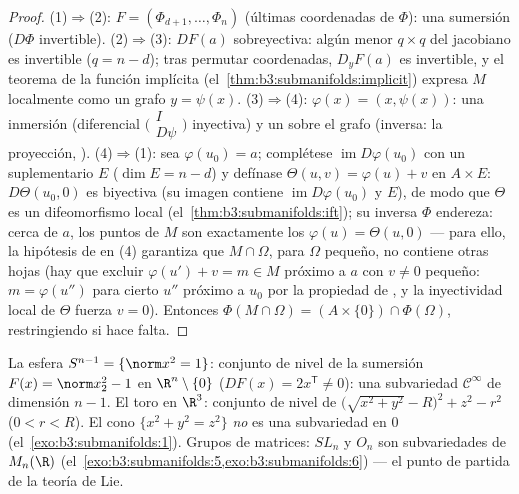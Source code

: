 \begin{proof}
(1)$\Rightarrow$(2): $F = (\Phi_{d+1}, \dots, \Phi_n)$ (últimas
coordenadas de $\Phi$): una sumersión ($D\Phi$ invertible).
(2)$\Rightarrow$(3): $DF(a)$ sobreyectiva: algún menor $q \times q$ del
jacobiano es invertible ($q = n - d$); tras permutar coordenadas,
$D_yF(a)$ es invertible, y el teorema de la función implícita
(el~\cref{thm:b3:submanifolds:implicit}) expresa $M$ localmente como un
grafo $y = \psi(x)$. (3)$\Rightarrow$(4): $\varphi(x) = (x, \psi(x))$:
una inmersión (diferencial $\bigl(\begin{smallmatrix}I\\
D\psi\end{smallmatrix}\bigr)$ inyectiva) y un
 sobre el grafo
(inversa: la proyección, ).
(4)$\Rightarrow$(1): sea $\varphi(u_0) = a$;
complétese
$\operatorname{im}D\varphi(u_0)$ con un suplementario $E$
($\dim E = n - d$) y defínase $\Theta(u, v) = \varphi(u) + v$ en
$A\times E$: $D\Theta(u_0, 0)$ es biyectiva (su imagen contiene
$\operatorname{im}D\varphi(u_0)$ y $E$), de modo que $\Theta$ es un
difeomorfismo local (el~\cref{thm:b3:submanifolds:ift}); su inversa
$\Phi$ endereza: cerca de $a$, los puntos de $M$ son exactamente los
$\varphi(u) = \Theta(u, 0)$ --- para ello, la hipótesis de
 en (4) garantiza que
$M\cap\Omega$, para $\Omega$ pequeño, no contiene otras hojas (hay que
excluir $\varphi(u') + v = m \in
M$ próximo a $a$ con $v \neq 0$ pequeño: $m = \varphi(u'')$ para cierto
$u''$ próximo a $u_0$ por la propiedad de
, y la inyectividad
local de $\Theta$ fuerza $v = 0$). Entonces
$\Phi(M\cap\Omega) = (A\times\{0\})
\cap\Phi(\Omega)$, restringiendo si hace falta.
\end{proof}

\begin{example}\label{ex:b3:submanifolds:examples}
La esfera $S^{n-1} = \{\norm x^2 = 1\}$: conjunto de nivel de la
sumersión $F(x) = \norm x_2^2 - 1$ en
$\R^n\setminus\{0\}$ ($DF(x) = 2x^{\mathsf T} \ne 0$):
una subvariedad $\mathcal C^\infty$ de dimensión $n - 1$. El toro en
$\R^3$: conjunto de nivel de $\bigl(\sqrt{x^2 + y^2} -
R\bigr)^2 + z^2 - r^2$ ($0 < r < R$). El cono $\{x^2 + y^2 =
z^2\}$ \emph{no} es una subvariedad en $0$
(el~\cref{exo:b3:submanifolds:1}). Grupos de matrices: $SL_n$ y $O_n$
son subvariedades de $M_n(\R)$
(el~\cref{exo:b3:submanifolds:5,exo:b3:submanifolds:6}) --- el punto de
partida de la teoría de Lie.
\end{example}

